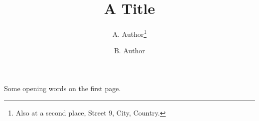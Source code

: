 \documentclass{article}
\title{A Title}
\author{A. Author\thanks{Also at a second place, Street 9, City, Country.} \and B. Author}
\begin{document}
\maketitle

Some opening words on the first page.


\end{document}
